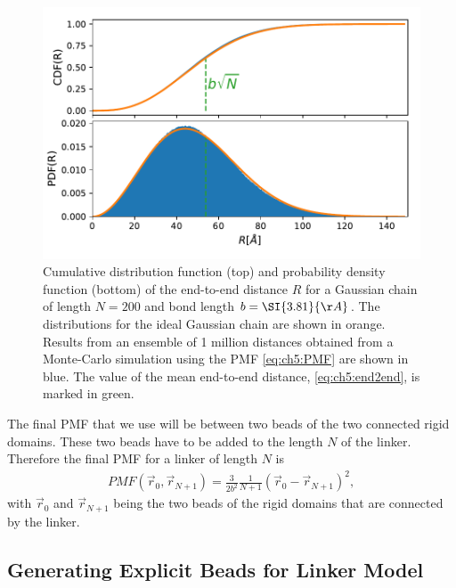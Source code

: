 \documentclass[12pt, twoside]{report}
\begin{document}
\begin{figure}[!ht]
  \centering
\includegraphics{figures/gauss-model}
\caption[Cumulative distribution function and probability density function of
the end-to-end distance $R$ for a Gaussian chain.]{Cumulative distribution
  function (top) and probability density function (bottom) of the end-to-end
  distance $R$ for a Gaussian chain of length $N=200$ and bond length
  $b=\SI{3.81}{\AA}$. The distributions for the ideal Gaussian chain are shown
  in orange. Results from an ensemble of 1 million distances obtained from a
  Monte-Carlo simulation using the PMF \cref{eq:ch5:PMF} are shown in blue. The
  value of the mean end-to-end distance, \cref{eq:ch5:end2end}, is marked in
  green.}
\label{fig:gauss-model}
\end{figure}

The final \gls{PMF} that we use will be between two beads of the two connected
rigid domains. These two beads have to be added to the length \(N\) of the
linker. Therefore the final \gls{PMF} for a linker of length \(N\) is
\begin{align}
  \label{eq:ch5:PMF-complexes} PMF(\vec{r}_0, \vec{r}_{N+1}) = \frac{3}{2 b^2}
\frac{1}{N+1} (\vec{r}_0 - \vec{r}_{N+1})^2,
\end{align} with \(\vec{r}_0\) and \(\vec{r}_{N+1}\) being the two beads of the
rigid domains that are connected by the linker.

\subsection{Generating Explicit Beads for Linker Model}
\end{document}
